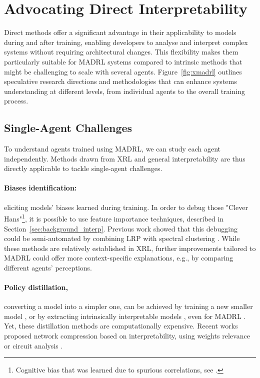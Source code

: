 \section{Advocating Direct Interpretability}
\label{sec:advocate}

Direct methods offer a significant advantage in their applicability to models during and after training, enabling developers to analyse and interpret complex systems without requiring architectural changes. This flexibility makes them particularly suitable for MADRL systems compared to intrinsic methods that might be challenging to scale with several agents. Figure~\ref{fig:xmadrl} outlines speculative research directions and methodologies that can enhance systems understanding at different levels, from individual agents to the overall training process.


\subsection{Single-Agent Challenges}

To understand agents trained using MADRL, we can study each agent independently.
Methods drawn from XRL and general interpretability are thus directly applicable to tackle single-agent challenges.

\paragraph{Biases identification:}eliciting models' biases learned during training. In order to debug those "Clever Hans"\footnote{Cognitive bias that was learned due to spurious correlations, see \cite{Lapuschkin2019UnmaskingCH}.}, it is possible to use feature importance techniques, described in Section~\ref{sec:background_interp}. Previous work \cite{Lapuschkin2019UnmaskingCH} showed that this debugging could be semi-automated by combining LRP \cite{Bach2015OnPE} with spectral clustering \cite{Luxburg2007ATO}.  While these methods are relatively established in XRL, further improvements tailored to MADRL could offer more context-specific explanations, e.g., by comparing different agents' perceptions.

\paragraph{Policy distillation,} converting a model into a simpler one, can be achieved by training a new smaller model \cite{Rusu2015PolicyD}, or by extracting intrinsically interpretable models \cite{Ross2010ARO,Bastani2018VerifiableRL}, even for MADRL \cite{Milani2022MAVIPERLD}. Yet, these distillation methods are computationally expensive. Recent works proposed network compression based on interpretability, using weights relevance \cite{Yeom2019PruningBE} or circuit analysis
\cite{Pochinkov2024DissectingLM}.

